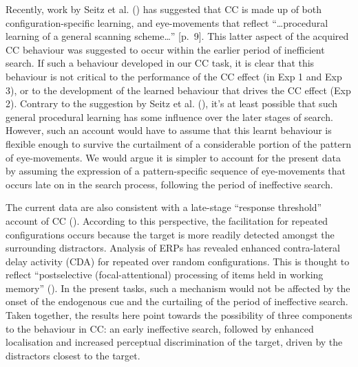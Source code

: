 \documentclass[
  man,
  floatsintext,
  longtable,
  nolmodern,
  notxfonts,
  notimes,
  colorlinks=true,linkcolor=blue,citecolor=blue,urlcolor=blue]{apa7}
\begin{document}
Recently, work by Seitz et al. () has
suggested that CC is made up of both configuration-specific learning,
and eye-movements that reflect ``\ldots procedural learning of a general
scanning scheme\ldots{}'' {[}p.~9{]}. This latter aspect of the acquired
CC behaviour was suggested to occur within the earlier period of
inefficient search. If such a behaviour developed in our CC task, it is
clear that this behaviour is not critical to the performance of the CC
effect (in Exp 1 and Exp 3), or to the development of the learned
behaviour that drives the CC effect (Exp 2). Contrary to the suggestion
by Seitz et al. (), it's at least possible
that such general procedural learning has some influence over the later
stages of search. However, such an account would have to assume that
this learnt behaviour is flexible enough to survive the curtailment of a
considerable portion of the pattern of eye-movements. We would argue it
is simpler to account for the present data by assuming the expression of
a pattern-specific sequence of eye-movements that occurs late on in the
search process, following the period of ineffective search.

The current data are also consistent with a late-stage ``response
threshold'' account of CC (). According to this perspective, the facilitation for repeated
configurations occurs because the target is more readily detected
amongst the surrounding distractors. Analysis of ERPs has revealed
enhanced contra-lateral delay activity (CDA) for repeated over random
configurations. This is thought to reflect ``postselective
(focal-attentional) processing of items held in working memory''
(). In the present tasks, such
a mechanism would not be affected by the onset of the endogenous cue and
the curtailing of the period of ineffective search. Taken together, the
results here point towards the possibility of three components to the
behaviour in CC: an early ineffective search, followed by enhanced
localisation and increased perceptual discrimination of the target,
driven by the distractors closest to the target.
\end{document}
